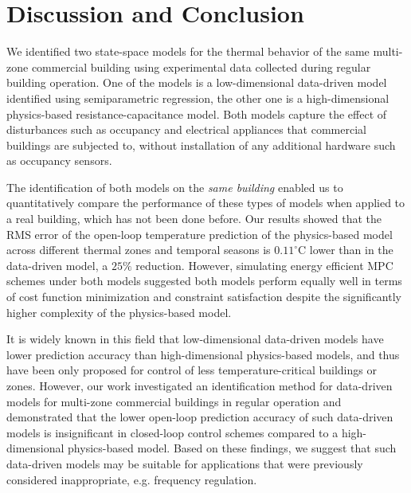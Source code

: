 
\section{Discussion and Conclusion}
\label{sec:Conclusion}

We identified two state-space models for the thermal behavior of the same multi-zone commercial building using experimental data collected during regular building operation. One of the models is a low-dimensional data-driven model identified using semiparametric regression, the other one is a high-dimensional physics-based resistance-capacitance model. Both models capture the effect of disturbances such as occupancy and electrical appliances that commercial buildings are subjected to, without installation of any additional hardware such as occupancy sensors. 

The identification of both models on the \textit{same building} enabled us to quantitatively compare the performance of these types of models when applied to a real building, which has not been done before. Our results showed that the RMS error of the open-loop temperature prediction of the physics-based model across different thermal zones and temporal seasons is $0.11^\circ \text{C}$ lower than in the data-driven model, a $25\%$ reduction. However, simulating energy efficient MPC schemes under both models suggested both models perform equally well in terms of cost function minimization and constraint satisfaction despite the significantly higher complexity of the physics-based model.


It is widely known in this field that low-dimensional data-driven models have lower prediction accuracy than high-dimensional physics-based models, and thus have been only proposed for control of less temperature-critical buildings or zones. However, our work investigated an identification method for data-driven models for multi-zone commercial buildings in regular operation and demonstrated that the lower open-loop prediction accuracy of such data-driven models is insignificant in closed-loop control schemes compared to a high-dimensional physics-based model. Based on these findings, we suggest that such data-driven models may be suitable for applications that were previously considered inappropriate, e.g. frequency regulation.

